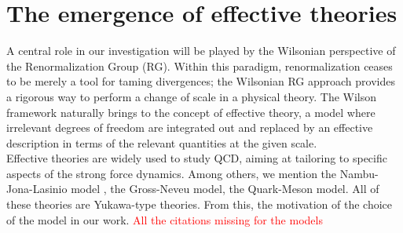 \section{The emergence of effective theories}
A central role in our investigation will be played by the Wilsonian perspective of the Renormalization Group (RG). Within this paradigm, renormalization ceases to be merely a tool for taming divergences; 
the Wilsonian RG approach provides a rigorous way to perform a change of scale in a physical theory. The Wilson framework naturally brings to the concept of effective theory, a model where irrelevant degrees of freedom are integrated out and replaced by an effective description in terms of the relevant quantities at the given scale.  \\
Effective theories are widely used to study QCD, aiming at tailoring to specific aspects of the strong force dynamics. 
Among others, we mention the Nambu-Jona-Lasinio model \cite{Nambu1961DynamicalI, Nambu1961DynamicalII}, the Gross-Neveu model, the Quark-Meson model. All of these theories are Yukawa-type theories. From this, the motivation of the choice of the model in our work. \textcolor{red}{All the citations missing for the models}
